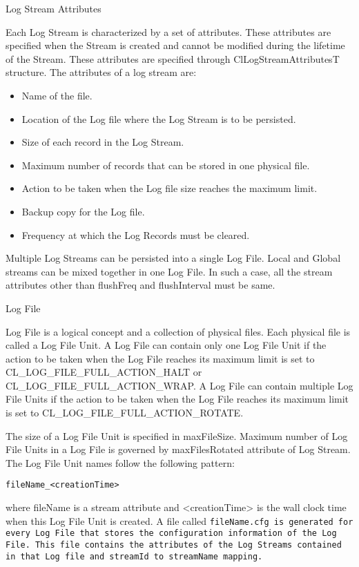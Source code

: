 \begin{flushleft}
\begin{Desc}
\item[Log Stream Attributes]
\end{Desc}

Each Log Stream is characterized by a set of attributes. These attributes are specified when the Stream is created and cannot be modified during the
lifetime of the Stream. These attributes are specified through ClLogStreamAttributesT structure.
The attributes of a log stream are: 
\begin{itemize}
\item
Name of the file.
\item
Location of the Log file where the Log Stream is to be persisted.
\item
Size of each record in the Log Stream.
\item
Maximum number of records that can be stored in one physical file.
\item
Action to be taken when the Log file size reaches the maximum limit.
\item
Backup copy for the Log file.
\item
Frequency at which the Log Records must be cleared. 
\end{itemize}
Multiple Log Streams can be persisted into a single Log File. Local and Global streams can be mixed together in one Log File. In such a case, all the 
stream attributes other than flushFreq and flushInterval must be same.



\begin{Desc}
\item[Log File]
\end{Desc}

Log File is a logical concept and a collection of physical files. Each physical file is called a Log File Unit. 
A Log File can contain only one Log File Unit if the action to be taken when the Log File 
reaches its maximum limit is set to CL\_\-LOG\_\-FILE\_\-FULL\_\-ACTION\_\-HALT or CL\_\-LOG\_\-FILE\_\-FULL\_\-ACTION\_\-WRAP.
A Log File can contain multiple Log File Units if the action to be taken when the Log File 
reaches its maximum limit is set to CL\_\-LOG\_\-FILE\_\-FULL\_\-ACTION\_\-ROTATE.
\par
The size of a Log File Unit is specified in maxFileSize. Maximum number of Log File Units in a Log File is governed by maxFilesRotated attribute of
Log Stream. The Log File Unit names follow the following pattern: \par
{\tt{fileName\_\-<creationTime>}}
\par
where fileName is a stream attribute and <creationTime> is the
wall clock time when this Log File Unit is created. A file called \tt{fileName.cfg} is generated for every Log File that stores the configuration 
information of the Log File. This file contains the attributes of the Log Streams contained in that Log file and streamId to streamName mapping.







\end{flushleft}
